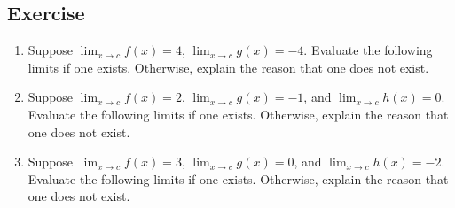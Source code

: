 \documentclass[11pt]{book}
\theoremstyle{break}
\theoremstyle{no_label}
\numberwithin{equation}{section}
\begin{document}
\subsection*{Exercise}

\begin{enumerate}[label=\arabic*.]
    \item Suppose $\displaystyle\lim_{x\to c}f(x)=4$, $\displaystyle\lim_{x\to c}g(x)=-4$. Evaluate the following limits if one exists. Otherwise, explain the reason that one does not exist.
    \begin{enumerate}
    \end{enumerate}
    \item Suppose $\displaystyle\lim_{x\to c}f(x)=2$, $\displaystyle\lim_{x\to c}g(x)=-1$, and $\displaystyle\lim_{x\to c}h(x)=0$. Evaluate the following limits if one exists. Otherwise, explain the reason that one does not exist.
    \begin{enumerate}
    \end{enumerate}
    \item Suppose $\displaystyle\lim_{x\to c}f(x)=3$, $\displaystyle\lim_{x\to c}g(x)=0$, and $\displaystyle\lim_{x\to c}h(x)=-2$. Evaluate the following limits if one exists. Otherwise, explain the reason that one does not exist.

\end{enumerate}
\end{document}
